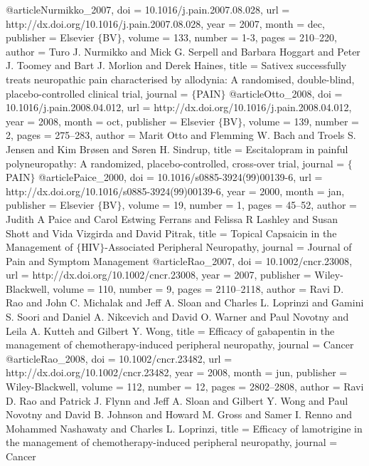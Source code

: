 @article{Nurmikko_2007,
	doi = {10.1016/j.pain.2007.08.028},
	url = {http://dx.doi.org/10.1016/j.pain.2007.08.028},
	year = 2007,
	month = {dec},
	publisher = {Elsevier $\lbrace$BV$\rbrace$},
	volume = {133},
	number = {1-3},
	pages = {210--220},
	author = {Turo J. Nurmikko and Mick G. Serpell and Barbara Hoggart and Peter J. Toomey and Bart J. Morlion and Derek Haines},
	title = {Sativex successfully treats neuropathic pain characterised by allodynia: A randomised, double-blind, placebo-controlled clinical trial},
	journal = {$\lbrace$PAIN$\rbrace$}
}
@article{Otto_2008,
	doi = {10.1016/j.pain.2008.04.012},
	url = {http://dx.doi.org/10.1016/j.pain.2008.04.012},
	year = 2008,
	month = {oct},
	publisher = {Elsevier $\lbrace$BV$\rbrace$},
	volume = {139},
	number = {2},
	pages = {275--283},
	author = {Marit Otto and Flemming W. Bach and Troels S. Jensen and Kim Br{\o}sen and S{\o}ren H. Sindrup},
	title = {Escitalopram in painful polyneuropathy: A randomized, placebo-controlled, cross-over trial},
	journal = {$\lbrace$PAIN$\rbrace$}
}
@article{Paice_2000,
	doi = {10.1016/s0885-3924(99)00139-6},
	url = {http://dx.doi.org/10.1016/s0885-3924(99)00139-6},
	year = 2000,
	month = {jan},
	publisher = {Elsevier $\lbrace$BV$\rbrace$},
	volume = {19},
	number = {1},
	pages = {45--52},
	author = {Judith A Paice and Carol Estwing Ferrans and Felissa R Lashley and Susan Shott and Vida Vizgirda and David Pitrak},
	title = {Topical Capsaicin in the Management of $\lbrace$HIV$\rbrace$-Associated Peripheral Neuropathy},
	journal = {Journal of Pain and Symptom Management}
}
@article{Rao_2007,
	doi = {10.1002/cncr.23008},
	url = {http://dx.doi.org/10.1002/cncr.23008},
	year = 2007,
	publisher = {Wiley-Blackwell},
	volume = {110},
	number = {9},
	pages = {2110--2118},
	author = {Ravi D. Rao and John C. Michalak and Jeff A. Sloan and Charles L. Loprinzi and Gamini S. Soori and Daniel A. Nikcevich and David O. Warner and Paul Novotny and Leila A. Kutteh and Gilbert Y. Wong},
	title = {Efficacy of gabapentin in the management of chemotherapy-induced peripheral neuropathy},
	journal = {Cancer}
}
@article{Rao_2008,
	doi = {10.1002/cncr.23482},
	url = {http://dx.doi.org/10.1002/cncr.23482},
	year = 2008,
	month = {jun},
	publisher = {Wiley-Blackwell},
	volume = {112},
	number = {12},
	pages = {2802--2808},
	author = {Ravi D. Rao and Patrick J. Flynn and Jeff A. Sloan and Gilbert Y. Wong and Paul Novotny and David B. Johnson and Howard M. Gross and Samer I. Renno and Mohammed Nashawaty and Charles L. Loprinzi},
	title = {Efficacy of lamotrigine in the management of chemotherapy-induced peripheral neuropathy},
	journal = {Cancer}
}
